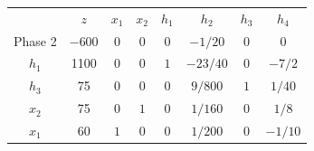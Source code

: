 \begin{center}
\begin{tabular}{c|c|cccccc|}
 & $z$ & $x_1$ & $x_2$ & $h_1$ & $h_2$ & $h_3$ & $h_4$\\ 
Phase 2 & $-600$ & $0$ & $0$ & $0$ & $-1/20$ & $0$ & $0$ \\ 
\hline
$h_1$ & 1100  & $0$ & $0$ & $1$ & $-23/40$ & $0$ & $-7/2$\\ 
$h_3$ & 75  & $0$ & $0$ & $0$ & $9/800$ & $1$ & $1/40$\\ 
$x_2$ & 75  & $0$ & $1$ & $0$ & $1/160$ & $0$ & $1/8$\\ 
$x_1$ & 60  & $1$ & $0$ & $0$ & $1/200$ & $0$ & $-1/10$\\ 
\hline
\end{tabular}
\end{center}



